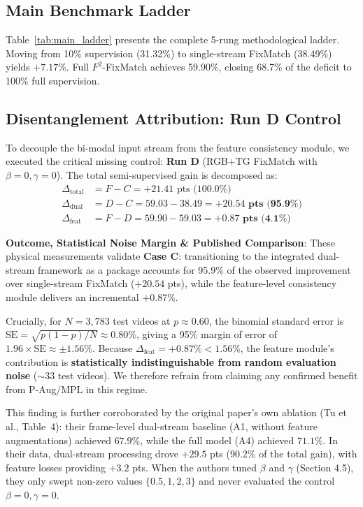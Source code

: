 \documentclass[10pt,twocolumn,letterpaper]{article}
\begin{document}
\subsection{Main Benchmark Ladder}
Table~\ref{tab:main_ladder} presents the complete 5-rung methodological ladder. Moving from 10\% supervision (31.32\%) to single-stream FixMatch (38.49\%) yields $+7.17\%$. Full $F^2$-FixMatch achieves 59.90\%, closing 68.7\% of the deficit to 100\% full supervision.

\subsection{Disentanglement Attribution: Run D Control}
To decouple the bi-modal input stream from the feature consistency module, we executed the critical missing control: \textbf{Run D} (RGB+TG FixMatch with $\beta=0, \gamma=0$). The total semi-supervised gain is decomposed as:
\begin{align}
    \Delta_{\text{total}} &= F - C = +21.41\text{ pts (100.0\%)} \\
    \Delta_{\text{dual}} &= D - C = 59.03 - 38.49 = \mathbf{+20.54\text{ pts (95.9\%)}} \\
    \Delta_{\text{feat}} &= F - D = 59.90 - 59.03 = \mathbf{+0.87\text{ pts (4.1\%)}}
\end{align}

\noindent \textbf{Outcome, Statistical Noise Margin \& Published Comparison}:  
These physical measurements validate \textbf{Case C}: transitioning to the integrated dual-stream framework as a package accounts for 95.9\% of the observed improvement over single-stream FixMatch ($+20.54$ pts), while the feature-level consistency module delivers an incremental $+0.87\%$.

Crucially, for $N = 3{,}783$ test videos at $p \approx 0.60$, the binomial standard error is $\mathrm{SE} = \sqrt{p(1-p)/N} \approx 0.80\%$, giving a 95\% margin of error of $1.96 \times \mathrm{SE} \approx \pm 1.56\%$. Because $\Delta_{\text{feat}} = +0.87\% < 1.56\%$, the feature module's contribution is \textbf{statistically indistinguishable from random evaluation noise} ($\sim 33$ test videos). We therefore refrain from claiming any confirmed benefit from P-Aug/MPL in this regime.

This finding is further corroborated by the original paper's own ablation (Tu et al., Table~4): their frame-level dual-stream baseline (A1, without feature augmentations) achieved $67.9\%$, while the full model (A4) achieved $71.1\%$. In their data, dual-stream processing drove $+29.5$ pts (90.2\% of the total gain), with feature losses providing $+3.2$ pts. When the authors tuned $\beta$ and $\gamma$ (Section 4.5), they only swept non-zero values $\{0.5, 1, 2, 3\}$ and never evaluated the control $\beta = 0, \gamma = 0$.
\end{document}
